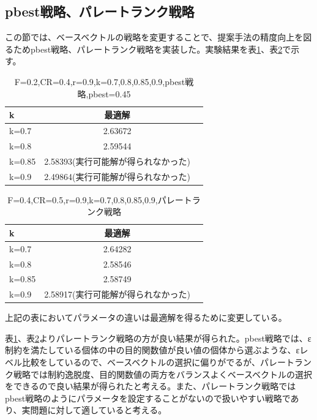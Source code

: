 \documentclass[twocolumn,10pt]{jarticle}
\begin{document}
\subsection{pbest戦略、パレートランク戦略}
この節では、ベースベクトルの戦略を変更することで、提案手法の精度向上を図るためpbest戦略、パレートランク戦略を実装した。実験結果を表\ref{tbl:MLP3}、表\ref{tbl:MLP4}で示す。
\begin{table}[htbp]
\begin{center}
\caption{F=0.2,CR=0.4,r=0.9,k={0.7,0.8,0.85,0.9},pbest戦略,pbest=0.45}
\label{tbl:MLP3}
\begin{tabular}{|l|c|c|}
\hline
k     & 最適解  \\ \hline
k=0.7 & 2.63672\\ \hline
k=0.8 & 2.59544\\ \hline
k=0.85 & 2.58393(実行可能解が得られなかった)\\ \hline
k=0.9 & 2.49864(実行可能解が得られなかった)\\ \hline
\end{tabular}
\end{center}
\end{table}

\begin{table}[htbp]
\begin{center}
\caption{F=0.4,CR=0.5,r=0.9,k={0.7,0.8,0.85,0.9},パレートランク戦略}
\label{tbl:MLP4}
\begin{tabular}{|l|c|c|}
\hline
k     & 最適解  \\ \hline
k=0.7 & 2.64282\\ \hline
k=0.8 & 2.58546\\ \hline
k=0.85 & 2.58749\\ \hline
k=0.9 & 2.58917(実行可能解が得られなかった)\\ \hline
\end{tabular}
\end{center}
\end{table}
上記の表においてパラメータの違いは最適解を得るために変更している。

表\ref{tbl:MLP3}、表\ref{tbl:MLP4}よりパレートランク戦略の方が良い結果が得られた。pbest戦略では、ε制約を満たしている個体の中の目的関数値が良い値の個体から選ぶような、εレベル比較をしているので、ベースベクトルの選択に偏りがでるが、パレートランク戦略では制約逸脱度、目的関数値の両方をバランスよくベースベクトルの選択をできるので良い結果が得られたと考える。また、パレートランク戦略ではpbest戦略のようにパラメータを設定することがないので扱いやすい戦略であり、実問題に対して適していると考える。
\end{document}
